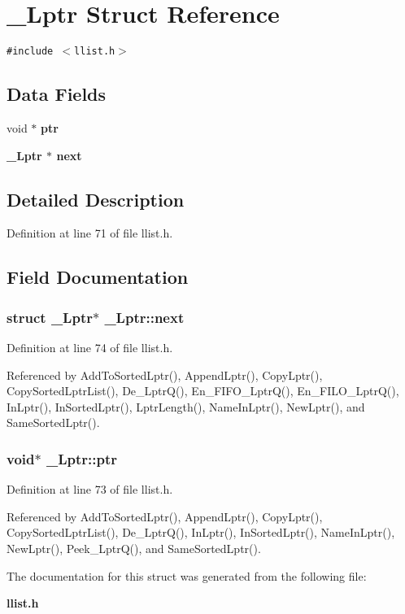 \section{\_\-Lptr Struct Reference}
\label{struct__Lptr}
{\tt \#include $<$llist.h$>$}

\subsection*{Data Fields}
\begin{CompactItemize}
\item 
void $\ast$ \bf{ptr}
\item 
\bf{\_\-Lptr} $\ast$ \bf{next}
\end{CompactItemize}


\subsection{Detailed Description}




Definition at line 71 of file llist.h.

\subsection{Field Documentation}
\subsubsection{\setlength{\rightskip}{0pt plus 5cm}struct \bf{\_\-Lptr}$\ast$ \bf{\_\-Lptr::next}}\label{struct__Lptr_c98e1bd41d6b23184ea9c3f8bba18210}




Definition at line 74 of file llist.h.

Referenced by Add\-To\-Sorted\-Lptr(), Append\-Lptr(), Copy\-Lptr(), Copy\-Sorted\-Lptr\-List(), De\_\-Lptr\-Q(), En\_\-FIFO\_\-Lptr\-Q(), En\_\-FILO\_\-Lptr\-Q(), In\-Lptr(), In\-Sorted\-Lptr(), Lptr\-Length(), Name\-In\-Lptr(), New\-Lptr(), and Same\-Sorted\-Lptr().
\subsubsection{\setlength{\rightskip}{0pt plus 5cm}void$\ast$ \bf{\_\-Lptr::ptr}}\label{struct__Lptr_831d52b4460989dbeea488f6dbd44ffc}




Definition at line 73 of file llist.h.

Referenced by Add\-To\-Sorted\-Lptr(), Append\-Lptr(), Copy\-Lptr(), Copy\-Sorted\-Lptr\-List(), De\_\-Lptr\-Q(), In\-Lptr(), In\-Sorted\-Lptr(), Name\-In\-Lptr(), New\-Lptr(), Peek\_\-Lptr\-Q(), and Same\-Sorted\-Lptr().

The documentation for this struct was generated from the following file:\begin{CompactItemize}
\item 
\bf{llist.h}\end{CompactItemize}
